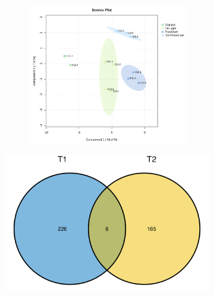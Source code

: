 \begin{figure}[!hptb]
\begin{subfigure}[b]{0.42\textwidth}
      \caption{}
      \label{fig:Sig171FeaturesRedSamples}
    \end{subfigure}
    \hfill
    \begin{minipage}[b]{0.57\textwidth}
      \begin{subfigure}[b]{\linewidth}
      \begin{subfigure}[b]{\linewidth}
	    \includegraphics[width=\textwidth]{Figures/PLSDA_SigFeaturesRedSamplesRedGroupsSecondTimePoint.pdf}
        \caption{}
        \label{fig:FeaturesTimePoint_plsda}
      \end{subfigure}
	    \includegraphics[width=\textwidth]{Figures/SharedFeaturesVenn_Time.png}

\end{subfigure}
\end{minipage}
\end{figure}
